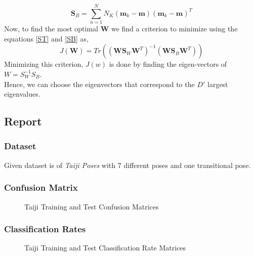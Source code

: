 \documentclass[12pt,twoside,a4paper]{article}
\begin{document}
\begin{equation} \label{SB}
    \textbf{S}_B = \sum_{n=1}^N N_K(\textbf{m}_k - \textbf{m})(\textbf{m}_k - \textbf{m})^T
\end{equation}
Now, to find the most optimal \textbf{W} we find a criterion to minimize using the equations \eqref{ST} and \eqref{SB} as,
\begin{equation}
    J(\textbf{W}) = Tr\left( (\textbf{W}\textbf{S}_W\textbf{W}^T)^{-1} (\textbf{W}\textbf{S}_B\textbf{W}^T) \right )
\end{equation}
Minimizing this criterion, $J(w)$ is done by finding the eigen-vectors of $W = S_W^{-1}S_B$. \\
Hence, we can choose the eigenvectors that correspond to the $D'$ largest eigenvalues.

\pagebreak
\subsection{Report}
\subsubsection{Dataset}
Given dataset is of \textit{Taiji Poses} with 7 different poses and one transitional pose.
\subsubsection{Confusion Matrix}
\begin{figure}[H]
    \centering
    \hspace{0mm}
    \hspace{0mm}
    \caption{Taiji Training and Test Confusion Matrices}
\end{figure}
\subsubsection{Classification Rates}
\begin{figure}[H]
    \centering
    \hspace{0mm}
    \hspace{0mm}
    \caption{Taiji Training and Test Classification Rate Matrices}
\end{figure}
\end{document}
